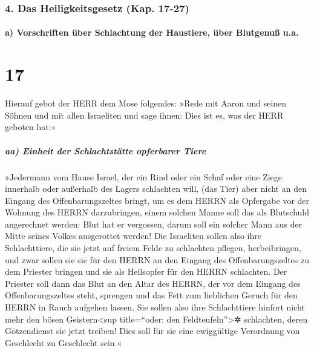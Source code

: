 \hypertarget{das-heiligkeitsgesetz-kap.-17-27}{%
\subsubsection{4. Das Heiligkeitsgesetz (Kap.
17-27)}\label{das-heiligkeitsgesetz-kap.-17-27}}

\hypertarget{a-vorschriften-uxfcber-schlachtung-der-haustiere-uxfcber-blutgenuuxdf-u.a.}{%
\paragraph{a) Vorschriften über Schlachtung der Haustiere, über
Blutgenuß
u.a.}\label{a-vorschriften-uxfcber-schlachtung-der-haustiere-uxfcber-blutgenuuxdf-u.a.}}

\hypertarget{section-16}{%
\section{17}\label{section-16}}

Hierauf gebot der HERR dem Mose folgendes:
»Rede mit Aaron und seinen Söhnen und mit allen Israeliten
und sage ihnen: Dies ist es, was der HERR geboten hat:«

\hypertarget{aa-einheit-der-schlachtstuxe4tte-opferbarer-tiere}{%
\subparagraph{aa) Einheit der Schlachtstätte opferbarer
Tiere}\label{aa-einheit-der-schlachtstuxe4tte-opferbarer-tiere}}

»Jedermann vom Hause Israel, der ein Rind oder ein Schaf
oder eine Ziege innerhalb oder außerhalb des Lagers schlachten will,
(das Tier) aber nicht an den Eingang des
Offenbarungszeltes bringt, um es dem HERRN als Opfergabe vor der Wohnung
des HERRN darzubringen, einem solchen Manne soll das als Blutschuld
angerechnet werden: Blut hat er vergossen, darum soll ein solcher Mann
aus der Mitte seines Volkes ausgerottet werden! Die
Israeliten sollen also ihre Schlachttiere, die sie jetzt auf freiem
Felde zu schlachten pflegen, herbeibringen, und zwar sollen sie sie für
den HERRN an den Eingang des Offenbarungszeltes zu dem Priester bringen
und sie als Heilsopfer für den HERRN schlachten. Der
Priester soll dann das Blut an den Altar des HERRN, der vor dem Eingang
des Offenbarungszeltes steht, sprengen und das Fett zum lieblichen
Geruch für den HERRN in Rauch aufgehen lassen. Sie sollen
also ihre Schlachttiere hinfort nicht mehr den bösen
Geistern\textless sup title=``oder: den Feldteufeln''\textgreater✲
schlachten, deren Götzendienst sie jetzt treiben! Dies soll für sie eine
ewiggültige Verordnung von Geschlecht zu Geschlecht sein.«

